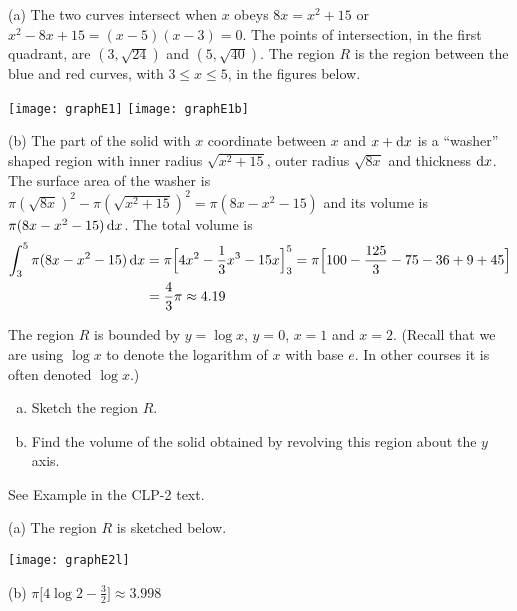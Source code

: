 \begin{solution} (a)
The two curves intersect when $x$ obeys $8x=x^2+15$
or $x^2-8x+15=(x-5)(x-3)=0$. The points of intersection, in the first quadrant,
are $(3,\sqrt{24})$ and $(5, \sqrt{40})$. The region $R$ is the region
between the blue and red curves, with $3\le x\le 5$,  in the figures below.

\begin{center}
       \texttt{[image: graphE1]}\qquad
       \texttt{[image: graphE1b]}
\end{center}

\item{}(b) The part of the solid with $x$ coordinate between $x$ and $x+\mathrm{d}x$
is a ``washer'' shaped region with inner radius $\sqrt{x^2+15}$, outer
radius $\sqrt{8x}$ and thickness $\mathrm{d}x$. The surface area of the washer is
$\pi(\sqrt{8x})^2 -\pi(\sqrt{x^2+15})^2=\pi(8x-x^2-15)$ and its volume is
$\pi(8x-x^2-15)\,\mathrm{d}x$. The total volume is
\begin{align*}
\int_3^5 \pi(8x-x^2-15)\,\mathrm{d}x
&=\pi\Big[4x^2-\frac{1}{3}x^3-15 x\Big]_3^5
=\pi\Big[100-\frac{125}{3}-75-36+9+45\Big] \\
&=\frac{4}{3}\pi\approx 4.19
\end{align*}

\end{solution}


\begin{Mquestion}[1996D] %
 The region $R$ is bounded by $y=\log x$, $y=0$, $x=1$ and $x=2$.
(Recall that we are using $\log x$ to denote the logarithm of $x$ with
base $e$. In other courses it is often denoted $\log x$.)
\begin{enumerate}[(a)]
\item
Sketch the region $R$.
\item
Find the volume of the solid obtained by revolving this region  about the $y$ axis.
\end{enumerate}
\end{Mquestion}

\begin{hint}
See Example  in the
CLP-2 text.
\end{hint}

\begin{answer} (a)
The region $R$ is sketched below.

\begin{center}
       \texttt{[image: graphE2l]}
\end{center}

\noindent (b) $\pi\Big[4\log 2 - \frac{3}{2}\Big] \approx 3.998$
\end{answer}


